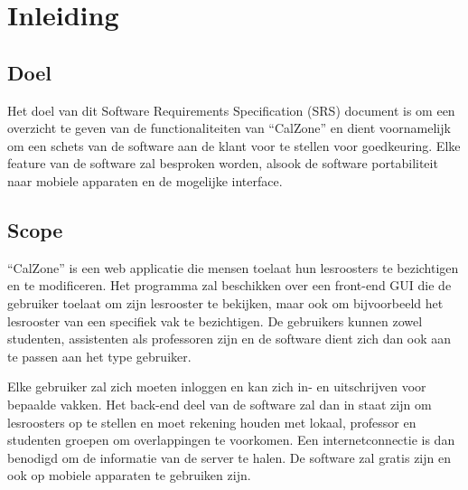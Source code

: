 \chapter{Inleiding}
\section{Doel}
Het doel van dit Software Requirements Specification (SRS) document is om een overzicht te geven van de functionaliteiten van “CalZone” en dient voornamelijk om een schets van de software aan de klant voor te stellen voor goedkeuring. 
Elke feature van de software zal besproken worden, alsook de software portabiliteit naar mobiele apparaten en de mogelijke interface.

\section{Scope}
“CalZone” is een web applicatie die mensen toelaat hun lesroosters te bezichtigen en te modificeren. 
Het programma zal beschikken over een front-end GUI die de gebruiker toelaat om zijn lesrooster te bekijken, maar ook om bijvoorbeeld het lesrooster van een specifiek vak te bezichtigen. 
De gebruikers kunnen zowel studenten, assistenten als professoren zijn en de software dient zich dan ook aan te passen aan het type gebruiker. 

Elke gebruiker zal zich moeten inloggen en kan zich in- en uitschrijven voor bepaalde vakken. 
Het back-end deel van de software zal dan in staat zijn om lesroosters op te stellen en moet rekening houden met lokaal, professor en studenten groepen om overlappingen te voorkomen. 
Een internetconnectie is dan benodigd om de informatie van de server te halen. 
De software zal gratis zijn en ook op mobiele apparaten te gebruiken zijn.
